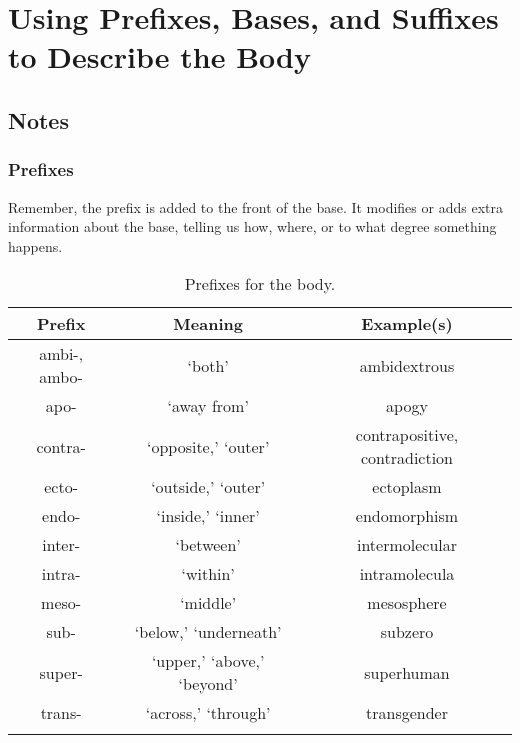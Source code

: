 %
%
%
\chapter{Using Prefixes, Bases, and Suffixes to Describe the Body}
\label{Body} %








\abstract{}


\section{Notes}
\label{sec:NOTE2}

\subsection{Prefixes}

Remember, the prefix is added to the front of the base. It modifies or adds extra information about the base, telling us how, where, or to what degree something happens.

\begin{longtable}{c | c | c}
    \caption{Prefixes for the body.}
    \hline 
    Prefix & Meaning & Example(s) \\ \hline
    ambi-, ambo- & `both' & ambidextrous \\ 
    apo- & `away from' & apogy \\
    contra- & `opposite,' `outer' & contrapositive, contradiction \\
    ecto- & `outside,' `outer' & ectoplasm \\
    endo- & `inside,' `inner' & endomorphism \\
    inter- & `between' & intermolecular \\
    intra- & `within' & intramolecula \\
    meso- & `middle' & mesosphere \\
    sub- & `below,' `underneath' & subzero \\
    super- & `upper,' `above,' `beyond' & superhuman \\
    trans- & `across,' `through' & transgender \\
    \label{tab:Ch2Prefix}
\end{longtable}



